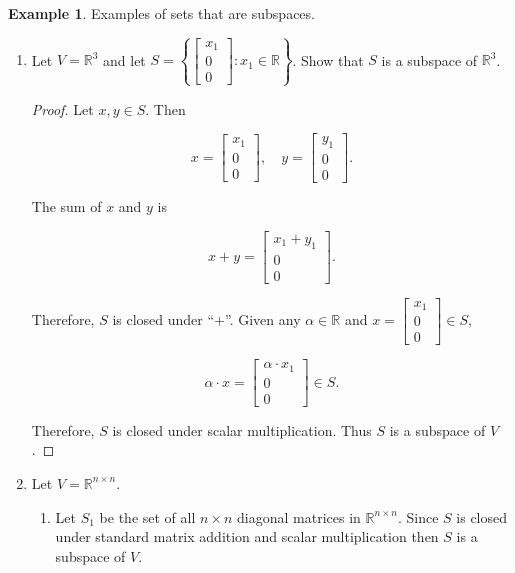 \documentclass[12pt]{article}
\theoremstyle{definition}
\newtheorem*{example}{Example}
\begin{document}
\begin{example}

Examples of sets that are subspaces.

\begin{enumerate}[label = (\arabic*)]

\item Let $V = \mathbb{R}^3$ and let 
$\displaystyle S = \left\{ \begin{bmatrix} x_1 \\ 0 \\ 0 \end{bmatrix} :
x_1 \in \mathbb{R} \right\} $. Show that $S$ is a subspace of $\mathbb{R}^3$.

\begin{proof}
Let $x, y \in S$. Then

\[
x = 
\begin{bmatrix}
x_1 \\
0 \\
0
\end{bmatrix},
\quad
y =
\begin{bmatrix}
y_1 \\
0 \\
0
\end{bmatrix}
.
\]

The sum of $x$ and $y$ is

\[
x + y = 
\begin{bmatrix}
x_1 + y_1 \\
0 \\
0
\end{bmatrix}.
\]

Therefore, $S$ is closed under ``$+$''. Given any $\alpha \in \mathbb{R}$ and
$x = \begin{bmatrix} x_1 \\ 0 \\ 0 \end{bmatrix} \in S$,

\[
\alpha \cdot x =
\begin{bmatrix}
\alpha \cdot x_1 \\
0 \\
0
\end{bmatrix}
\in S.
\]

Therefore, $S$ is closed under scalar multiplication. Thus $S$ is a subspace of $V$.
\end{proof}

\item Let $V = \mathbb{R}^{n \times n}$.

\begin{enumerate}[label = (\roman*)]
\item Let $S_1$ be the set of all $n \times n$ diagonal matrices in $\mathbb{R}^{n \times n}$.
Since $S$ is closed under standard matrix addition and scalar multiplication then $S$ is a
subspace of $V$.


\end{enumerate}
\end{enumerate}
\end{example}
\end{document}
